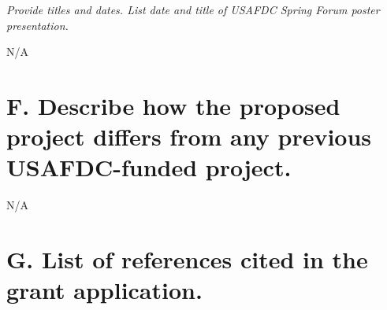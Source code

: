 \documentclass[10pt]{article}
\begin{document}
\textit{Provide titles and dates.  List date and title of USAFDC Spring Forum poster presentation.}

N/A













\section*{F.	Describe how the proposed project differs from any previous USAFDC-funded project.}


N/A














\section*{G. List of references cited in the grant application.}





\end{document}

